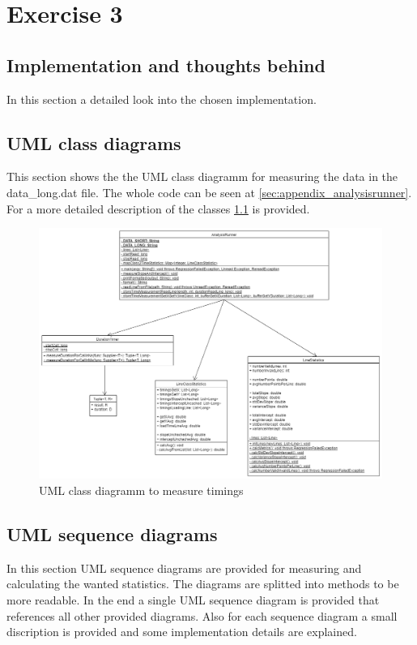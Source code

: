 \chapter{Exercise 3}

\section{Implementation and thoughts behind}
\label{sec:detail_impl_analysisrunner}
In this section a detailed look into the chosen implementation.

\section{UML class diagrams}
\label{sec:class_diagram}
This section shows the the UML class diagramm for measuring the data in the data\_long.dat file. The whole code can be seen at \ref{sec:appendix_analysisrunner}. For a more detailed description of the classes \ref{sec:detail_impl_analysisrunner} is provided.

\begin{landscape}
    \begin{figure}
        \begin{center}
            \includegraphics[width=1.60\textwidth]{img/classdiagram.png}
            \caption{UML class diagramm to measure timings}
        \end{center}
    \end{figure}
\end{landscape}

\section{UML sequence diagrams}
\label{sec:seq_diagrams}
In this section UML sequence diagrams are provided for measuring and calculating the wanted statistics. The diagrams are splitted into methods to be more readable. In the end a single UML sequence diagram is provided that references all other provided diagrams. Also for each sequence diagram a small discription is provided and some implementation details are explained.

